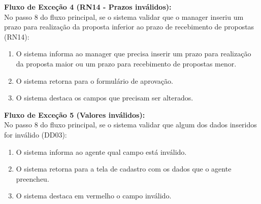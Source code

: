 \noindent\textbf{Fluxo de Exceção 4 (RN14 - Prazos inválidos):}\\
No passo 8 do fluxo principal, se o sistema validar que o manager inseriu um prazo para realização da proposta inferior ao prazo de recebimento de propostas (RN14):
\begin{enumerate}[noitemsep, topsep=-5pt, parsep=0pt]
    \item O sistema informa ao manager que precisa inserir um prazo para realização da proposta maior ou um prazo para recebimento de propostas menor.
    \item O sistema retorna para o formulário de aprovação.
    \item O sistema destaca os campos que precisam ser alterados.
\end{enumerate}

\noindent\textbf{Fluxo de Exceção 5 (Valores inválidos):}\\
No passo 8 do fluxo principal, se o sistema validar que algum dos dados inseridos for inválido (DD03):
\begin{enumerate}[noitemsep, topsep=-5pt, parsep=0pt]
    \item O sistema informa ao agente qual campo está inválido.
    \item O sistema retorna para a tela de cadastro com os dados que o agente preencheu.
    \item O sistema destaca em vermelho o campo inválido.
\end{enumerate}


